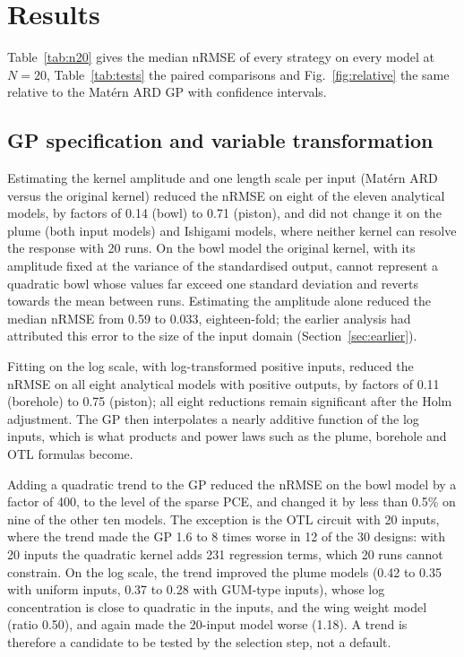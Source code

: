 
\section{Results}
\label{sec:results}
\label{sec:res-main}
Table~\ref{tab:n20} gives the median nRMSE of every strategy on every model
at $N=20$, Table~\ref{tab:tests} the paired comparisons and
Fig.~\ref{fig:relative} the same relative to the Mat\'ern ARD GP with
confidence intervals.

\subsection{GP specification and variable transformation}
Estimating the kernel amplitude and one length scale per input (Mat\'ern ARD
versus the original kernel) reduced the nRMSE on eight of the eleven
analytical models, by factors of 0.14 (bowl) to 0.71 (piston), and did
not change it on the plume (both input models) and Ishigami models, where neither kernel can resolve the response
with 20 runs. On the bowl model the original kernel, with its amplitude
fixed at the variance of the standardised output, cannot represent a
quadratic bowl whose values far exceed one standard deviation and reverts
towards the mean between runs. Estimating the amplitude alone reduced the
median nRMSE from 0.59 to 0.033, eighteen-fold; the earlier analysis had
attributed this error to the size of the input domain
(Section~\ref{sec:earlier}).

Fitting on the log scale, with log-transformed positive inputs, reduced the
nRMSE on all eight analytical models with positive outputs, by factors of 0.11
(borehole) to 0.75 (piston); all eight reductions remain significant
after the Holm adjustment. The GP then interpolates a nearly additive function
of the log inputs, which is what products and power laws such as the
plume, borehole and OTL formulas become.

Adding a quadratic trend to the GP reduced the nRMSE on the bowl model
by a factor of 400, to the level of the sparse PCE, and changed it by
less than 0.5\% on nine of the other ten models. The exception is the OTL
circuit with 20 inputs, where the trend made the GP 1.6 to 8 times worse in
12 of the 30 designs: with 20 inputs the quadratic kernel adds 231
regression terms, which 20 runs cannot constrain. On the log scale, the
trend improved the plume models (0.42 to 0.35 with uniform inputs,
0.37 to 0.28 with GUM-type inputs), whose log concentration is close to quadratic
in the inputs, and the wing weight model (ratio 0.50), and again made the
20-input model worse (1.18). A trend is therefore a candidate to be tested
by the selection step, not a default.


